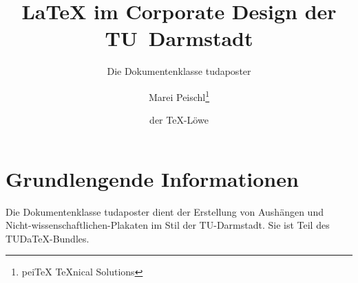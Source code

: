 \documentclass[
	paper=a0,
	ngerman,
	accentcolor=9c,
	logo=body,%
	footer=true,
	]{tudaposter}
\begin{document}
\title{\LaTeX{} im Corporate Design der TU~Darmstadt}
\subtitle{Die Dokumentenklasse tudaposter}
\author{Marei Peischl\thanks{pei\TeX{} \TeX{}nical Solutions}\and der \TeX-Löwe}

\titlegraphic{\color{red!20}\rule{\contentwidth}{.5\contentheight}}



\maketitle

\section*{Grundlengende Informationen}
Die Dokumentenklasse tudaposter dient der Erstellung von Aushängen und Nicht-wissenschaftlichen-Plakaten im Stil der TU-Darmstadt. Sie ist Teil des TUDa\TeX-Bundles.
\end{document}
